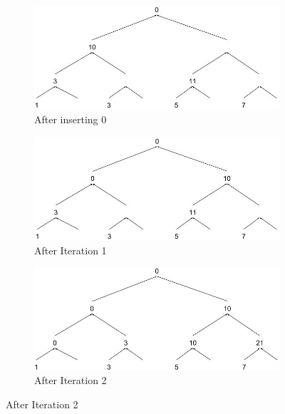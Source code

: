 \documentclass[11pt]{article}
\begin{document}
\begin{figure}[t]
    \centering
    \begin{subfigure}[h!]{0.49\textwidth}
        \centering
        \includegraphics[width=\textwidth]{sweepDown2}
        \caption{After inserting 0}
        \label{fig:TA}
    \end{subfigure}
    \hfill
    \begin{subfigure}[h!]{0.49\textwidth}
        \centering
        \includegraphics[width=\textwidth]{sweepDown3}
        \caption{After Iteration 1}
        \label{fig:TB}
    \end{subfigure}
    \hfill
    \begin{subfigure}[h!]{0.49\textwidth}
        \centering
        \includegraphics[width=\textwidth]{sweepDown4}
        \caption{After Iteration 2}
        \label{fig:TC}
    \end{subfigure}
    \hfill

\end{figure}
\end{document}
